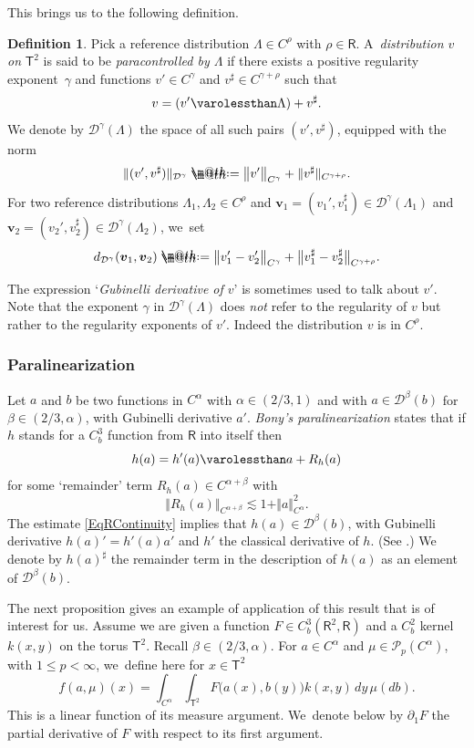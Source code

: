 \documentclass[10pt]{amsart}
\makeatletter
\theoremstyle{definition}
\newtheorem{defn}[thm]{Definition}
\newcommand\bbR{\mathbf{\mathsf{R}}}
\newcommand{\bsfT}{\mathbf{\mathsf{T}}}
\newcommand{\mcD}{\mathcal{D}}
\newcommand{\mcP}{\mathcal{P}}
\newcommand{\bsv}{\boldsymbol{v}}
\newcommand*{\defeq}{\mathrel{\rlap{%
\raisebox{0.3ex}{$\m@th\cdot$}}%
\raisebox{-0.3ex}{$\m@th\cdot$}}%
=}
\newcommand{\norme}[1]{\Vert #1 \Vert}
\makeatother
\begin{document}
This brings us to the following definition.

\begin{defn} \label{DefnSpacePCStructure}
Pick a reference distribution $\Lambda\in C^\rho$ with $\rho\in\bbR$. A~\emph{distribution $v$ on} \emph{$\bsfT^2$} is said to be \emph{paracontrolled by $\Lambda$} if there exists a positive regularity exponent~$\gamma$ and functions $v'\in C^\gamma$ and $v^\sharp\in C^{\gamma+\rho}$ such that
\[
v = (v'\varolessthan\Lambda) + v^\sharp.
\]
We denote by $\mcD^\gamma(\Lambda)$ the space of all such pairs $(v',v^\sharp)$, equipped with the norm
\begin{equation*}
\norme{(v', v^\sharp)}_{\mcD^\gamma} \defeq \big\Vert v'\big\Vert_{C^\gamma} + \norme{v^\sharp}_{C^{\gamma+\rho}}.
\end{equation*}
For two reference distributions $\Lambda_1,\Lambda_2\in C^\rho$ and $\bsv_1=(v_1', v_1^\sharp)\in\mcD^\gamma(\Lambda_1)$ and $\bsv_2 = (v_2',v_2^\sharp)\in\mcD^\gamma(\Lambda_2)$, we~set
\[
d_{\mcD^\gamma}(\bsv_1,\bsv_2) \defeq \big\Vert v_1' - v_2'\big\Vert_{C^\gamma} + \big\Vert v_1^\sharp - v_2^\sharp \big\Vert_{C^{\gamma+\rho}}.
\]
\end{defn}

The expression `\emph{Gubinelli derivative of $v$}' is sometimes used to talk about $v'$. Note that the exponent $\gamma$ in $\mcD^\gamma(\Lambda)$ does \emph{not} refer to the regularity of $v$ but rather to the regularity exponents of $v'$. Indeed the distribution $v$ is in $C^\rho$.

\subsubsection*{Paralinearization} Let $a$ and $b$ be two functions in $C^\alpha$ with $\alpha\in(2/3,1)$ and with $a\in\mcD^\beta(b)$ for $\beta\in(2/3,\alpha)$, with Gubinelli derivative $a'$. {\it Bony's paralinearization} states that if $h$ stands for a $C^3_b$ function from $\bbR$ into itself then
\[
h(a) = h'(a)\varolessthan a + R_h(a)
\]
for some `remainder' term $R_h(a)\in C^{\alpha+\beta}$ with
\[
\norme{R_h(a)}_{C^{\alpha+\beta}}\lesssim 1+\norme{a}_{C^\alpha}^2.
\]
The estimate \ref{EqRContinuity} implies that $h(a)\in\mcD^\beta(b)$, with Gubinelli derivative $h(a)' = h'(a)a'$ and $h'$ the classical derivative of $h$. (See \eg \cite[\S2.3]{GIP}.) We denote by $h(a)^\sharp$ the remainder term in the description of $h(a)$ as an element of $\mcD^\beta(b)$.

The next proposition gives an example of application of this result that is of interest for us. Assume we are given a function $F\in C_b^3(\bbR^2,\bbR)$ and a $C^2_b$ kernel $k(x,y)$ on the torus $\mathsf{T}^2$. Recall $\beta\in(2/3,\alpha)$. For $a\in C^\alpha$ and $\mu\in\mcP_{p}(C^\alpha)$, with $1\leq p<\infty$, we~define here for $x\in \mathsf{T}^2$
\begin{equation} \label{EqLongRangeF}
f(a,\mu)(x) = \int_{C^\alpha}\int_{\mathsf{T}^2} F\bigl(a(x), b(y)\bigr)k(x,y) \, dy \, \mu(db).
\end{equation}
This is a linear function of its measure argument. We~denote below by $\partial_1F$ the partial derivative of $F$ with respect to its first argument.
\end{document}
